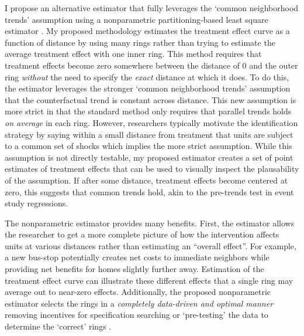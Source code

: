 I propose an alternative estimator that fully leverages the `common neighborhood trends' assumption using a nonparametric partitioning-based least square estimator \citep{cattaneo2019binscatter,Cattaneo_Farrell_Feng_2019}. My proposed methodology estimates the treatment effect curve as a function of distance by using many rings rather than trying to estimate the average treatment effect with one inner ring. This method requires that treatment effects become zero somewhere between the distance of 0 and the outer ring \textit{without} the need to specify the \textit{exact} distance at which it does. To do this, the estimator leverages the stronger `common neighborhood trends' assumption that the counterfactual trend is constant across distance. This new assumption is more strict in that the standard method only requires that parallel trends holds \textit{on average} in each ring. However, researchers typically motivate the identification strategy by saying within a small distance from treatment that units are subject to a common set of shocks which implies the more strict assumption. While this assumption is not directly testable, my proposed estimator creates a set of point estimates of treatment effects that can be used to visually inspect the plausability of the assumption. If after some distance, treatment effects become centered at zero, this suggests that common trends hold, akin to the pre-trends test in event study regressions.

The nonparametric estimator provides many benefits. First, the estimator allows the researcher to get a more complete picture of how the intervention affects units at various distances rather than estimating an ``overall effect''. For example, a new bus-stop potentially creates net costs to immediate neighbors while providing net benefits for homes slightly further away. Estimation of the treatment effect curve can illustrate these different effects that a single ring may average out to near-zero effects. Additionally, the proposed nonparametric estimator selects the rings in a \textit{completely data-driven and optimal manner} removing incentives for specification searching or `pre-testing' the data to determine the `correct' rings \citep{mccloskey2020critical,andrews2019identification}.

